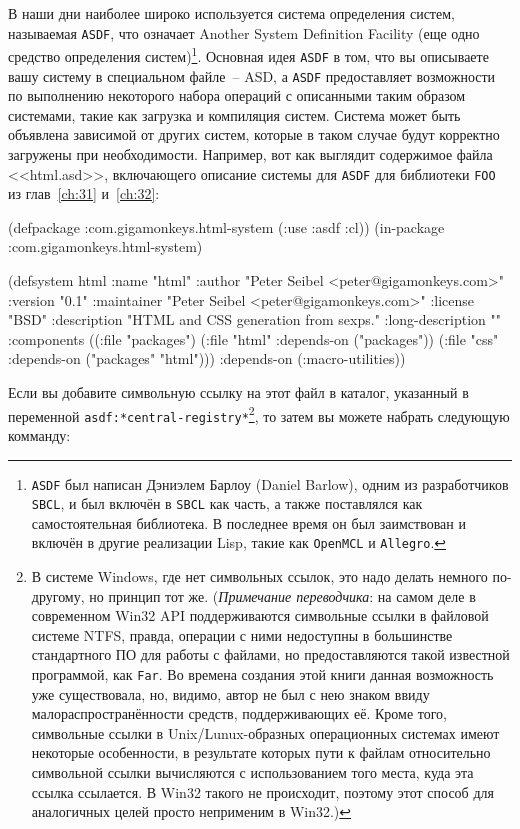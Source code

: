 В наши дни наиболее широко используется система определения систем, называемая
\lstinline{ASDF}, что означает Another System Definition Facility (еще одно средство
определения систем)\footnote{\lstinline{ASDF} был написан Дэниэлем Барлоу (Daniel Barlow),
  одним из разработчиков \lstinline{SBCL}, и был включён в \lstinline{SBCL} как часть, а
  также поставлялся как самостоятельная библиотека. В последнее время он был заимствован и
  включён в другие реализации Lisp, такие как \lstinline{OpenMCL} и
  \lstinline{Allegro}.}. Основная идея \lstinline{ASDF} в том, что вы описываете вашу
систему в специальном файле~-- ASD, а \lstinline{ASDF} предоставляет возможности по
выполнению некоторого набора операций с описанными таким образом системами, такие как
загрузка и компиляция систем. Система может быть объявлена зависимой от других систем,
которые в таком случае будут корректно загружены при необходимости. Например, вот как
выглядит содержимое файла <<html.asd>>, включающего описание системы для \lstinline{ASDF}
для библиотеки \lstinline{FOO} из глав~\ref{ch:31} и~\ref{ch:32}:

\begin{myverb}
(defpackage :com.gigamonkeys.html-system (:use :asdf :cl))
(in-package :com.gigamonkeys.html-system)

(defsystem html
  :name "html"
  :author "Peter Seibel <peter@gigamonkeys.com>"
  :version "0.1"
  :maintainer "Peter Seibel <peter@gigamonkeys.com>"
  :license "BSD"
  :description "HTML and CSS generation from sexps."
  :long-description ""
  :components
  ((:file "packages")
   (:file "html" :depends-on ("packages"))
   (:file "css" :depends-on ("packages" "html")))
  :depends-on (:macro-utilities))
\end{myverb}

Если вы добавите символьную ссылку на этот файл в каталог, указанный в переменной
\lstinline{asdf:*central-registry*}\footnote{В системе Windows, где нет символьных ссылок, это
  надо делать немного по-другому, но принцип тот же. (\emph{Примечание переводчика}: на самом
  деле в современном Win32 API поддерживаются символьные ссылки в файловой системе NTFS,
  правда, операции с ними недоступны в большинстве стандартного ПО для работы с файлами, но
  предоставляются такой известной программой, как \lstinline{Far}. Во времена создания этой
  книги данная возможность уже существовала, но, видимо, автор не был с нею знаком ввиду
  малораспространённости средств, поддерживающих её. Кроме того, символьные ссылки в
  Unix/Lunux-образных операционных системах имеют некоторые особенности, в результате
  которых пути к файлам относительно символьной ссылки вычисляются с использованием того
  места, куда эта ссылка ссылается. В Win32 такого не происходит, поэтому этот способ для
  аналогичных целей просто неприменим в Win32.) }, то затем вы можете набрать следующую
комманду:

